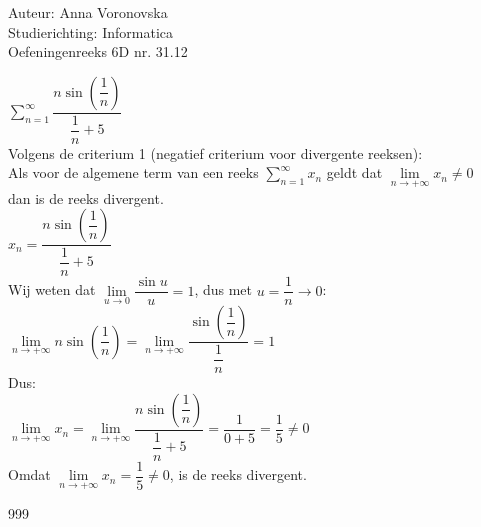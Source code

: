 \documentclass[a4paper]{article}
\begin{document}
  
\noindent \large Auteur: Anna Voronovska \\
\noindent \large Studierichting: Informatica\\
\noindent \large Oefeningenreeks 6D nr. 31.12\\

\medskip

\normalsize

$\displaystyle\sum_{n=1}^{\infty} \dfrac{n\sin\left(\dfrac{1}{n}\right)}{\dfrac{1}{n}+5}$\\

Volgens de criterium 1 (negatief criterium voor divergente reeksen):\\

Als voor de algemene term van een reeks $\displaystyle\sum_{n=1}^{\infty} x_n$ geldt dat $\lim\limits_{n\to+\infty} x_n \neq 0$\\

dan is de reeks divergent.\\

$x_n = \dfrac{n\sin\left(\dfrac{1}{n}\right)}{\dfrac{1}{n}+5}$\\

Wij weten dat $\lim\limits_{u\to 0}\dfrac{\sin u}{u}=1$, dus met $u=\dfrac{1}{n}\to 0$:\\

$\lim\limits_{n\to+\infty} n\sin\left(\dfrac{1}{n}\right)
  = \lim\limits_{n\to+\infty} \dfrac{\sin\left(\dfrac{1}{n}\right)}{\dfrac{1}{n}}
  = 1$\\
  
Dus:\\

$\lim\limits_{n\to+\infty} x_n
  = \lim\limits_{n\to+\infty} \dfrac{n\sin\left(\dfrac{1}{n}\right)}{\dfrac{1}{n}+5}
  = \dfrac{1}{0+5} = \dfrac{1}{5} \neq 0$\\

Omdat $\lim\limits_{n\to+\infty} x_n = \dfrac{1}{5} \neq 0$, is de reeks divergent.




\begin{thebibliography}{999}
\end{thebibliography}
\end{document}
